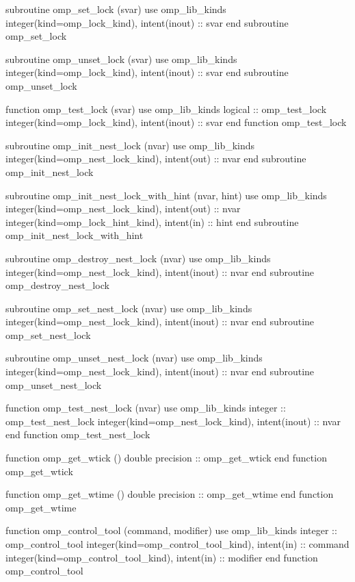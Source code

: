 {\begin{codepar}
          subroutine omp\_set\_lock (svar)
           use omp\_lib\_kinds
           integer(kind=omp\_lock\_kind), intent(inout) :: svar
          end subroutine omp\_set\_lock

          subroutine omp\_unset\_lock (svar)
           use omp\_lib\_kinds
           integer(kind=omp\_lock\_kind), intent(inout) :: svar
          end subroutine omp\_unset\_lock

          function omp\_test\_lock (svar)
           use omp\_lib\_kinds
           logical :: omp\_test\_lock
           integer(kind=omp\_lock\_kind), intent(inout) :: svar
          end function omp\_test\_lock

          subroutine omp\_init\_nest\_lock (nvar)
           use omp\_lib\_kinds
           integer(kind=omp\_nest\_lock\_kind), intent(out) :: nvar
          end subroutine omp\_init\_nest\_lock

          subroutine omp\_init\_nest\_lock\_with\_hint (nvar, hint)
           use omp\_lib\_kinds
           integer(kind=omp\_nest\_lock\_kind), intent(out) :: nvar
           integer(kind=omp\_lock\_hint\_kind), intent(in) :: hint
          end subroutine omp\_init\_nest\_lock\_with\_hint

          subroutine omp\_destroy\_nest\_lock (nvar)
           use omp\_lib\_kinds
           integer(kind=omp\_nest\_lock\_kind), intent(inout) :: nvar
          end subroutine omp\_destroy\_nest\_lock

          subroutine omp\_set\_nest\_lock (nvar)
           use omp\_lib\_kinds
           integer(kind=omp\_nest\_lock\_kind), intent(inout) :: nvar
          end subroutine omp\_set\_nest\_lock

          subroutine omp\_unset\_nest\_lock (nvar)
           use omp\_lib\_kinds
           integer(kind=omp\_nest\_lock\_kind), intent(inout) :: nvar
          end subroutine omp\_unset\_nest\_lock

          function omp\_test\_nest\_lock (nvar)
           use omp\_lib\_kinds
           integer :: omp\_test\_nest\_lock
           integer(kind=omp\_nest\_lock\_kind), intent(inout) :: nvar
          end function omp\_test\_nest\_lock

          function omp\_get\_wtick ()
           double precision :: omp\_get\_wtick
          end function omp\_get\_wtick

          function omp\_get\_wtime ()
           double precision :: omp\_get\_wtime
          end function omp\_get\_wtime
\begin{samepage}
          function omp\_control\_tool (command, modifier)
           use omp\_lib\_kinds
           integer :: omp\_control\_tool 
           integer(kind=omp\_control\_tool\_kind), intent(in) :: command
           integer(kind=omp\_control\_tool\_kind), intent(in) :: modifier
          end function omp\_control\_tool
\end{samepage}


\end{codepar}}
